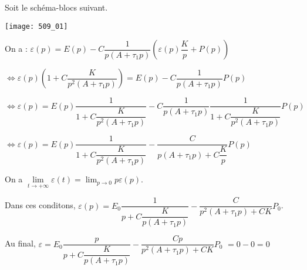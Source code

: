 \normaltrue \difficilefalse \tdifficilefalse
\correctiontrue


\setcounter{question}{0}%
\ifcorrection
\else
{}
\fi


\ifprof 
\else
Soit le schéma-blocs suivant.
\begin{marginfigure}
\texttt{[image: 509\_01]}
\end{marginfigure}
 \fi
 
\ifprof

On a : 
$\varepsilon(p) = E(p)-C\dfrac{1}{p\left( A+\tau_1 p \right)} \left( \varepsilon(p)\dfrac{K}{p} + P(p)\right)$

$\Leftrightarrow \varepsilon(p) \left(1 +C\dfrac{K}{p^2\left( A+\tau_1 p \right)}\right) = E(p)-C\dfrac{1}{p\left( A+\tau_1 p \right)}  P(p)$

$\Leftrightarrow \varepsilon(p) = E(p)\dfrac{1}{1 +C\dfrac{K}{p^2\left( A+\tau_1 p \right)}}-C\dfrac{1}{p\left( A+\tau_1 p \right)} \dfrac{1}{1 +C\dfrac{K}{p^2\left( A+\tau_1 p \right)}} P(p)$

$\Leftrightarrow \varepsilon(p) = E(p)\dfrac{1}{1 +C\dfrac{K}{p^2\left( A+\tau_1 p \right)}}-\dfrac{C}{p\left( A+\tau_1 p \right) +C\dfrac{K}{p}} P(p)$


\else 
\fi

\ifprof

On a $\lim\limits_{t\to +\infty} \varepsilon(t) = \lim_{p\to 0} p\varepsilon(p)$.

Dans ces conditons, 
$\varepsilon(p) = E_0\dfrac{1}{p +C\dfrac{K}{p\left( A+\tau_1 p \right)}}-\dfrac{C}{p^2\left( A+\tau_1 p \right) +CK} P_0$.

Au final, $\varepsilon = E_0\dfrac{p}{p +C\dfrac{K}{p\left( A+\tau_1 p \right)}}-\dfrac{Cp}{p^2\left( A+\tau_1 p \right) +CK} P_0$ $=0-0 =0$
\else 
\fi

\ifprof

